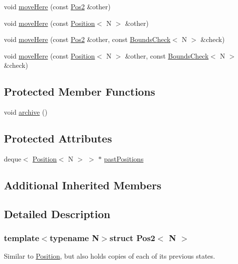 \begin{DoxyCompactItemize}
\item 
void \hyperlink{struct_pos2_aca684f49b5e27317ea5580f467e5d34a}{move\-Here} (const \hyperlink{struct_pos2}{Pos2} \&other)
\item 
void \hyperlink{struct_pos2_a112150629c1c77a913f401e8948849b0}{move\-Here} (const \hyperlink{struct_position}{Position}$<$ N $>$ \&other)
\item 
void \hyperlink{struct_pos2_a6f1f873271a2ce51509f419faf52ed54}{move\-Here} (const \hyperlink{struct_pos2}{Pos2} \&other, const \hyperlink{struct_bounds_check}{Bounds\-Check}$<$ N $>$ \&check)
\item 
void \hyperlink{struct_pos2_aa743473a51150e91792af64c00153ed9}{move\-Here} (const \hyperlink{struct_position}{Position}$<$ N $>$ \&other, const \hyperlink{struct_bounds_check}{Bounds\-Check}$<$ N $>$ \&check)
\end{DoxyCompactItemize}
\subsection*{Protected Member Functions}
\begin{DoxyCompactItemize}
\item 
void \hyperlink{struct_pos2_a082aa8d85af22b1a8d671c8a44c3b0eb}{archive} ()
\end{DoxyCompactItemize}
\subsection*{Protected Attributes}
\begin{DoxyCompactItemize}
\item 
deque$<$ \hyperlink{struct_position}{Position}$<$ N $>$ $>$ $\ast$ \hyperlink{struct_pos2_ab0e6af6b5960554712bcb717518f6ac3}{past\-Positions}
\end{DoxyCompactItemize}
\subsection*{Additional Inherited Members}


\subsection{Detailed Description}
\subsubsection*{template$<$typename N$>$struct Pos2$<$ N $>$}

Similar to \hyperlink{struct_position}{Position}, but also holds copies of each of its previous states. 

